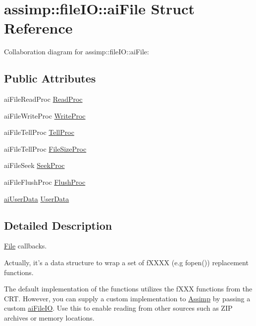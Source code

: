 \hypertarget{structassimp_1_1file_i_o_1_1ai_file}{\section{assimp\+:\+:file\+I\+O\+:\+:ai\+File Struct Reference}
\label{structassimp_1_1file_i_o_1_1ai_file}
}


Collaboration diagram for assimp\+:\+:file\+I\+O\+:\+:ai\+File\+:
\subsection*{Public Attributes}
\begin{DoxyCompactItemize}
\item 
ai\+File\+Read\+Proc \hyperlink{structassimp_1_1file_i_o_1_1ai_file_ac3fee446c1a1050a3c48a1c52dc28af8}{Read\+Proc}
\item 
ai\+File\+Write\+Proc \hyperlink{structassimp_1_1file_i_o_1_1ai_file_a571a1f7f01fca775a502c81ce844a3d5}{Write\+Proc}
\item 
ai\+File\+Tell\+Proc \hyperlink{structassimp_1_1file_i_o_1_1ai_file_a49a120ebe6246b31a39fbf4911fcc2bd}{Tell\+Proc}
\item 
ai\+File\+Tell\+Proc \hyperlink{structassimp_1_1file_i_o_1_1ai_file_a66351e0f070577889bac6d2f12f5dc3a}{File\+Size\+Proc}
\item 
ai\+File\+Seek \hyperlink{structassimp_1_1file_i_o_1_1ai_file_a974c276ec5ea1052adee9478406279c1}{Seek\+Proc}
\item 
ai\+File\+Flush\+Proc \hyperlink{structassimp_1_1file_i_o_1_1ai_file_a23f1bc417084c998e97452608e881800}{Flush\+Proc}
\item 
\hyperlink{namespaceassimp_1_1file_i_o_a8ab7edca38824d46ea9dfca09a051809}{ai\+User\+Data} \hyperlink{structassimp_1_1file_i_o_1_1ai_file_a00a10fe3fe0dbe0b48ac4e7cfe22519d}{User\+Data}
\end{DoxyCompactItemize}


\subsection{Detailed Description}
\hyperlink{class_file}{File} callbacks.

Actually, it's a data structure to wrap a set of {\ttfamily f\+X\+X\+X\+X} (e.\+g {\ttfamily fopen()}) replacement functions.

The default implementation of the functions utilizes the {\ttfamily f\+X\+X\+X} functions from the C\+R\+T. However, you can supply a custom implementation to \hyperlink{class_assimp}{Assimp} by passing a custom {\ttfamily \hyperlink{structassimp_1_1file_i_o_1_1ai_file_i_o}{ai\+File\+I\+O}}. Use this to enable reading from other sources such as Z\+I\+P archives or memory locations. 


